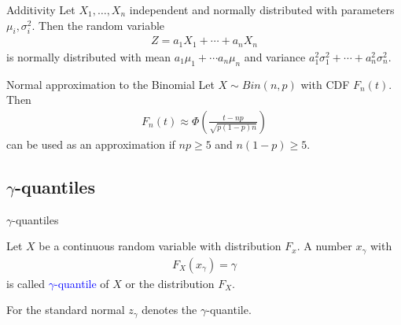 \documentclass{beamer}
\def\padding{\vspace{0.5cm}}
\def\b{\textcolor{blue}}
\begin{document}
\begin{frame}
    \begin{block}{Additivity}
        Let $X_1, \dots, X_n$ independent and normally distributed with parameters $\mu_i, \sigma_i^2$. Then the random variable
        \begin{align*}
            Z = a_1 X_1 + \cdots + a_n X_n
        \end{align*}
        is normally distributed with mean $a_1 \mu_1 + \cdots a_n \mu_n$ and variance $a_1^2 \sigma_1^2 + \cdots + a_n^2 \sigma_n^2$.
    \end{block}\pause\par\padding
    \begin{block}{Normal approximation to the Binomial}
        Let $X \sim Bin(n,p)$ with CDF $F_n(t)$. Then
        \begin{align*}
            F_n(t) \approx \Phi\left(\frac{t - n p}{\sqrt{p (1 - p) n}}\right)
        \end{align*}
        can be used as an approximation if $n p \geq 5$ and $n (1 - p) \geq 5$.
    \end{block}
\end{frame}

\subsection{$\gamma$-quantiles}
\begin{frame}{$\gamma$-quantiles}
    \begin{definition}
        Let $X$ be a continuous random variable with distribution $F_x$. A number $x_{\gamma}$ with
        \begin{align*}
            F_X(x_{\gamma}) = \gamma
        \end{align*}
        is called \b{$\gamma$-quantile} of $X$ or the distribution $F_X$.
    \end{definition}\pause\par\padding
    \begin{definition}
        For the standard normal $z_{\gamma}$ denotes the $\gamma$-quantile.
    \end{definition}
\end{frame}
\end{document}

